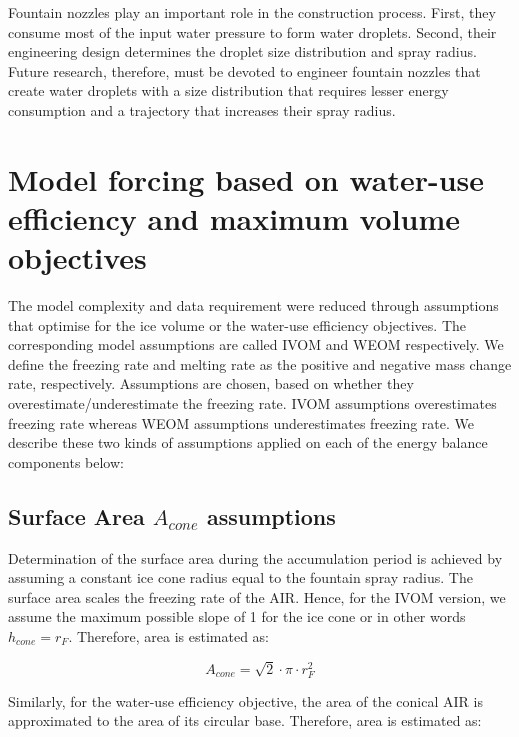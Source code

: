 \documentclass[tc, manuscript]{copernicus}
\begin{document}
Fountain nozzles play an important role in the construction process. First, they consume most of the input water
pressure to form water droplets. Second, their engineering design determines the droplet size distribution and
spray radius. Future research, therefore, must be devoted to engineer fountain nozzles that create water
droplets with a size distribution that requires lesser energy consumption and a trajectory that increases their
spray radius.

\appendix


\section{Model forcing based on water-use efficiency and maximum volume objectives} \label{sec:SEB}

The model complexity and data requirement \citep{balasubramanianInfluenceMeteorologicalConditions2022} were
reduced through assumptions that optimise for the ice volume or the water-use efficiency objectives. The
corresponding model assumptions are called IVOM and WEOM respectively. We define the freezing rate and melting
rate as the positive and negative mass change rate, respectively. Assumptions are chosen, based on whether they
overestimate/underestimate the freezing rate. IVOM assumptions overestimates freezing rate whereas WEOM
assumptions underestimates freezing rate. We describe these two kinds of assumptions applied on each of the
energy balance components below: 

\subsection{Surface Area $A_{cone}$ assumptions}

Determination of the surface area during the accumulation period is achieved by assuming a constant ice cone
radius equal to the fountain spray radius. The surface area scales the freezing rate of the AIR. Hence, for the
IVOM version, we assume the maximum possible slope of 1 for the ice cone or in other words $h_{cone} = r_{F}$.
Therefore, area is estimated as:  

\begin{equation} A_{cone} =\sqrt{2} \cdot \pi \cdot r_{F}^2  \end{equation}

Similarly, for the water-use efficiency objective, the area of the conical AIR is approximated to the area of
its circular base. Therefore, area is estimated as:
\end{document}
